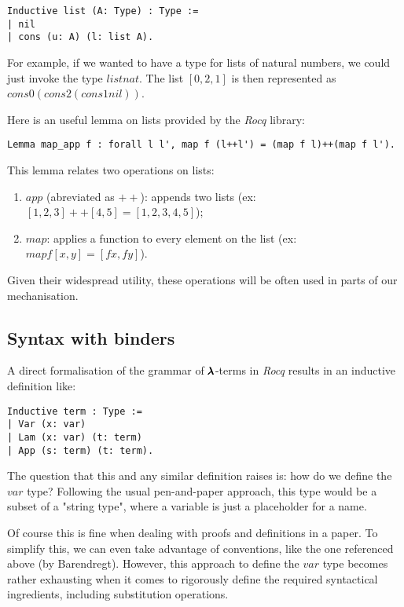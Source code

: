 \begin{lstlisting}[language=Coq]
Inductive list (A: Type) : Type :=
| nil
| cons (u: A) (l: list A).
\end{lstlisting}

For example, if we wanted to have a type for lists of natural numbers, we could just invoke the type \lst$list nat$.
The list \lst$[0,2,1]$ is then represented as \lst$cons 0 (cons 2 (cons 1 nil))$.

Here is an useful lemma on lists provided by the \textit{Rocq} library:
\begin{lstlisting}[language=Coq]
Lemma map_app f : forall l l', map f (l++l') = (map f l)++(map f l').
\end{lstlisting}

This lemma relates two operations on lists:
\begin{enumerate}
\item \lst$app$ (abreviated as \lst$++$): appends two lists (ex: \lst$[1,2,3]++[4,5] = [1,2,3,4,5]$);
\item \lst$map$: applies a function to every element on the list (ex: \lst$map f [x,y] = [f x, f y]$).
\end{enumerate}
Given their widespread utility, these operations will be often used in parts of our mechanisation.

\subsection{Syntax with binders}

A direct formalisation of the grammar of $\pmb{\lambda}$-terms in \textit{Rocq} results in an inductive definition like:
\begin{lstlisting}[language=Coq]
Inductive term : Type :=
| Var (x: var)
| Lam (x: var) (t: term)
| App (s: term) (t: term).
\end{lstlisting}

The question that this and any similar definition raises is: how do we define the \lst$var$ type? Following the usual pen-and-paper approach, this type would be a subset of a "string type", where a variable is just a placeholder for a name.

Of course this is fine when dealing with proofs and definitions in a paper.
To simplify this, we can even take advantage of conventions, like the one referenced above (by Barendregt).
However, this approach to define the \lst$var$ type becomes rather exhausting when it comes to rigorously define the required syntactical ingredients, including substitution operations.

